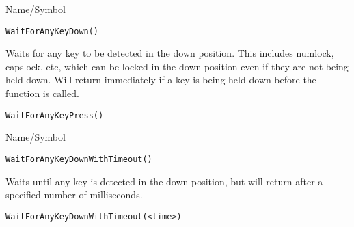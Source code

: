 \rl


\begin{desc}{Name/Symbol}
\item[Name/Symbol]  	\verb+WaitForAnyKeyDown()+

\item[Description]	
             Waits for any key to be detected in the down position.
             This includes numlock, capslock, etc, which can be locked
             in the down position even if they are not being held
             down.  Will return immediately if a key is being held
             down before the function is called. 

\item[Usage]		

\item[Example]	

\item[See Also]	
            \verb+WaitForAnyKeyPress()+
\end{desc}

\rl


\begin{desc}{Name/Symbol}
\item[Name/Symbol]  	\verb+WaitForAnyKeyDownWithTimeout()+

\item[Description] Waits until any key is detected in the down position, but will return
  after a specified number of milliseconds.

\item[Usage]
\begin{verbatim}
WaitForAnyKeyDownWithTimeout(<time>)
\end{verbatim}

\item[Example]	

\item[See Also]	
\end{desc}

\rl


